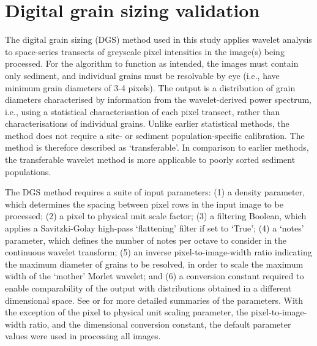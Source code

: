 \documentclass[jmse,article,submit,pdftex,moreauthors]{Definitions/mdpi}
\begin{document}
\section[\appendixname~\thesection]{Digital grain sizing validation}\label{Appendix}
The \citet{Buscombe2013} digital grain sizing (DGS) method used in this study applies wavelet analysis to space-series transects of greyscale pixel intensities in the image(s) being processed. For the algorithm to function as intended, the images must contain only sediment, and individual grains must be resolvable by eye (i.e., have minimum grain diameters of 3-4 pixels). The output is a distribution of grain diameters characterised by information from the wavelet-derived power spectrum, i.e., using a statistical characterisation of each pixel transect, rather than characterisations of individual grains. Unlike earlier statistical methods, the \citet{Buscombe2013} method does not require a site- or sediment population-specific calibration. The method is therefore described as `transferable'. In comparison to earlier methods, the transferable wavelet method is more applicable to poorly sorted sediment populations.

The DGS method requires a suite of input parameters: (1) a density parameter, which determines the spacing between pixel rows in the input image to be processed; (2) a pixel to physical unit scale factor; (3) a filtering Boolean, which applies a Savitzki-Golay high-pass `flattening' filter if set to `True'; (4) a `notes' parameter, which defines the number of notes per octave to consider in the continuous wavelet transform; (5) an inverse pixel-to-image-width ratio indicating the maximum diameter of grains to be resolved, in order to scale the maximum width of the `mother' Morlet wavelet; and (6) a conversion constant required to enable comparability of the output with distributions obtained in a different dimensional space. See \citet{Buscombe2013} or \citet{Cuttler_etal2017} for more detailed summaries of the parameters. With the exception of the pixel to physical unit scaling parameter, the pixel-to-image-width ratio, and the dimensional conversion constant, the default parameter values were used in processing all images.
\end{document}
